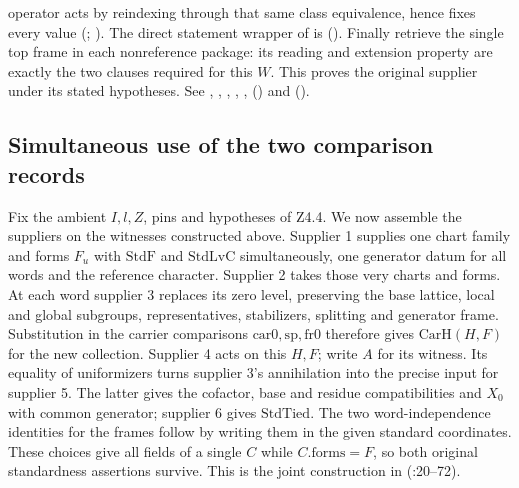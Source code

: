 operator acts by reindexing through that same class equivalence, hence
fixes every value (;
).
The direct statement wrapper of  is
().
Finally retrieve
the single top frame in each nonreference package: its reading and
extension property are exactly the two clauses required for this $W$.
This proves the original supplier
under its stated hypotheses.
See , , , , ,
 ()
and 
().

\subsection{Simultaneous use of the two comparison records}\label{r12:assembly}
Fix the ambient $I,l,Z$, pins and hypotheses of Z4.4. We now assemble the suppliers on the witnesses constructed above. Supplier 1 supplies
one chart family and forms $F_u$ with $\mathrm{StdF}$ and $\mathrm{StdLvC}$
simultaneously, one generator datum for all words and the reference
character. Supplier 2 takes those very charts and forms. At each word
supplier 3 replaces its zero level, preserving the base lattice, local
and global subgroups, representatives, stabilizers, splitting and
generator frame. Substitution in the carrier comparisons $\mathrm{car0},
\mathrm{sp},\mathrm{fr0}$ therefore gives $\mathrm{CarH}(H,F)$ for the
new collection. Supplier 4 acts on this $H,F$; write $A$ for its witness.
Its equality of uniformizers turns supplier 3's annihilation into the
precise input for supplier 5. The latter gives the cofactor, base and
residue compatibilities and $X_0$ with common generator; supplier 6
gives $\mathrm{StdTied}$. The two word-independence identities for the
frames follow by writing them in the given standard coordinates.
These choices give all fields of a single $C$ while $C.\mathrm{forms}=F$,
so both original standardness assertions survive. This is the joint
construction in 
(:20--72).

